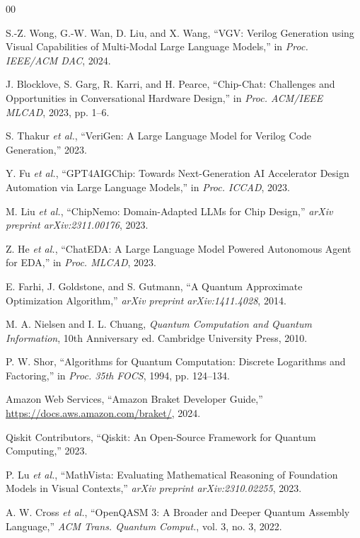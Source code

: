 \documentclass[conference]{IEEEtran}
\begin{document}
\begin{thebibliography}{00}

 S.-Z. Wong, G.-W. Wan, D. Liu, and X. Wang, ``VGV: Verilog Generation using Visual Capabilities of Multi-Modal Large Language Models,'' in \textit{Proc. IEEE/ACM DAC}, 2024.

 J. Blocklove, S. Garg, R. Karri, and H. Pearce, ``Chip-Chat: Challenges and Opportunities in Conversational Hardware Design,'' in \textit{Proc. ACM/IEEE MLCAD}, 2023, pp. 1--6.

 S. Thakur \textit{et al.}, ``VeriGen: A Large Language Model for Verilog Code Generation,'' 2023.

 Y. Fu \textit{et al.}, ``GPT4AIGChip: Towards Next-Generation AI Accelerator Design Automation via Large Language Models,'' in \textit{Proc. ICCAD}, 2023.

 M. Liu \textit{et al.}, ``ChipNemo: Domain-Adapted LLMs for Chip Design,'' \textit{arXiv preprint arXiv:2311.00176}, 2023.

 Z. He \textit{et al.}, ``ChatEDA: A Large Language Model Powered Autonomous Agent for EDA,'' in \textit{Proc. MLCAD}, 2023.

 E. Farhi, J. Goldstone, and S. Gutmann, ``A Quantum Approximate Optimization Algorithm,'' \textit{arXiv preprint arXiv:1411.4028}, 2014.

 M. A. Nielsen and I. L. Chuang, \textit{Quantum Computation and Quantum Information}, 10th Anniversary ed. Cambridge University Press, 2010.

 P. W. Shor, ``Algorithms for Quantum Computation: Discrete Logarithms and Factoring,'' in \textit{Proc. 35th FOCS}, 1994, pp. 124--134.

 Amazon Web Services, ``Amazon Braket Developer Guide,'' \url{https://docs.aws.amazon.com/braket/}, 2024.

 Qiskit Contributors, ``Qiskit: An Open-Source Framework for Quantum Computing,'' 2023.

 P. Lu \textit{et al.}, ``MathVista: Evaluating Mathematical Reasoning of Foundation Models in Visual Contexts,'' \textit{arXiv preprint arXiv:2310.02255}, 2023.

 A. W. Cross \textit{et al.}, ``OpenQASM 3: A Broader and Deeper Quantum Assembly Language,'' \textit{ACM Trans. Quantum Comput.}, vol. 3, no. 3, 2022.


\end{thebibliography}
\end{document}

